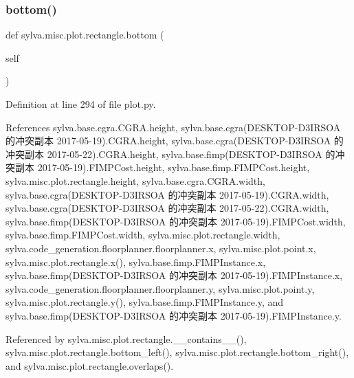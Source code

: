 \subsubsection{\texorpdfstring{bottom()}{bottom()}}
{\footnotesize\ttfamily def sylva.\+misc.\+plot.\+rectangle.\+bottom (\begin{DoxyParamCaption}\item[{}]{self }\end{DoxyParamCaption})}



Definition at line 294 of file plot.\+py.



References sylva.\+base.\+cgra.\+C\+G\+R\+A.\+height, sylva.\+base.\+cgra(\+D\+E\+S\+K\+T\+O\+P-\/\+D3\+I\+R\+S\+O\+A 的冲突副本 2017-\/05-\/19).\+C\+G\+R\+A.\+height, sylva.\+base.\+cgra(\+D\+E\+S\+K\+T\+O\+P-\/\+D3\+I\+R\+S\+O\+A 的冲突副本 2017-\/05-\/22).\+C\+G\+R\+A.\+height, sylva.\+base.\+fimp(\+D\+E\+S\+K\+T\+O\+P-\/\+D3\+I\+R\+S\+O\+A 的冲突副本 2017-\/05-\/19).\+F\+I\+M\+P\+Cost.\+height, sylva.\+base.\+fimp.\+F\+I\+M\+P\+Cost.\+height, sylva.\+misc.\+plot.\+rectangle.\+height, sylva.\+base.\+cgra.\+C\+G\+R\+A.\+width, sylva.\+base.\+cgra(\+D\+E\+S\+K\+T\+O\+P-\/\+D3\+I\+R\+S\+O\+A 的冲突副本 2017-\/05-\/19).\+C\+G\+R\+A.\+width, sylva.\+base.\+cgra(\+D\+E\+S\+K\+T\+O\+P-\/\+D3\+I\+R\+S\+O\+A 的冲突副本 2017-\/05-\/22).\+C\+G\+R\+A.\+width, sylva.\+base.\+fimp(\+D\+E\+S\+K\+T\+O\+P-\/\+D3\+I\+R\+S\+O\+A 的冲突副本 2017-\/05-\/19).\+F\+I\+M\+P\+Cost.\+width, sylva.\+base.\+fimp.\+F\+I\+M\+P\+Cost.\+width, sylva.\+misc.\+plot.\+rectangle.\+width, sylva.\+code\+\_\+generation.\+floorplanner.\+floorplanner.\+x, sylva.\+misc.\+plot.\+point.\+x, sylva.\+misc.\+plot.\+rectangle.\+x(), sylva.\+base.\+fimp.\+F\+I\+M\+P\+Instance.\+x, sylva.\+base.\+fimp(\+D\+E\+S\+K\+T\+O\+P-\/\+D3\+I\+R\+S\+O\+A 的冲突副本 2017-\/05-\/19).\+F\+I\+M\+P\+Instance.\+x, sylva.\+code\+\_\+generation.\+floorplanner.\+floorplanner.\+y, sylva.\+misc.\+plot.\+point.\+y, sylva.\+misc.\+plot.\+rectangle.\+y(), sylva.\+base.\+fimp.\+F\+I\+M\+P\+Instance.\+y, and sylva.\+base.\+fimp(\+D\+E\+S\+K\+T\+O\+P-\/\+D3\+I\+R\+S\+O\+A 的冲突副本 2017-\/05-\/19).\+F\+I\+M\+P\+Instance.\+y.



Referenced by sylva.\+misc.\+plot.\+rectangle.\+\_\+\+\_\+contains\+\_\+\+\_\+(), sylva.\+misc.\+plot.\+rectangle.\+bottom\+\_\+left(), sylva.\+misc.\+plot.\+rectangle.\+bottom\+\_\+right(), and sylva.\+misc.\+plot.\+rectangle.\+overlaps().


